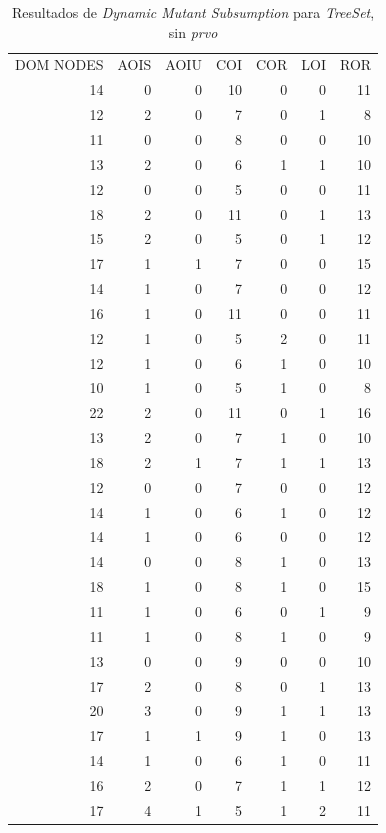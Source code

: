 \begin{table}[]
	\caption{Resultados de \emph{Dynamic Mutant Subsumption} para \emph{TreeSet}, sin \emph{prvo}}
	\label{tables.results.subsumption.treeset.noprvo}
	\centering
	\scriptsize
	\def\arraystretch{0.95}
	\setlength\tabcolsep{0.5mm}
	\begin{tabular}{rrrrrrr}
		DOM NODES & AOIS & AOIU & COI & COR & LOI & ROR \\
		14 & 0 & 0 & 10 & 0 & 0 & 11 \\
		12 & 2 & 0 & 7 & 0 & 1 & 8 \\
		11 & 0 & 0 & 8 & 0 & 0 & 10 \\
		13 & 2 & 0 & 6 & 1 & 1 & 10 \\
		12 & 0 & 0 & 5 & 0 & 0 & 11 \\
		18 & 2 & 0 & 11 & 0 & 1 & 13 \\
		15 & 2 & 0 & 5 & 0 & 1 & 12 \\
		17 & 1 & 1 & 7 & 0 & 0 & 15 \\
		14 & 1 & 0 & 7 & 0 & 0 & 12 \\
		16 & 1 & 0 & 11 & 0 & 0 & 11 \\
		12 & 1 & 0 & 5 & 2 & 0 & 11 \\
		12 & 1 & 0 & 6 & 1 & 0 & 10 \\
		10 & 1 & 0 & 5 & 1 & 0 & 8 \\
		22 & 2 & 0 & 11 & 0 & 1 & 16 \\
		13 & 2 & 0 & 7 & 1 & 0 & 10 \\
		18 & 2 & 1 & 7 & 1 & 1 & 13 \\
		12 & 0 & 0 & 7 & 0 & 0 & 12 \\
		14 & 1 & 0 & 6 & 1 & 0 & 12 \\
		14 & 1 & 0 & 6 & 0 & 0 & 12 \\
		14 & 0 & 0 & 8 & 1 & 0 & 13 \\
		18 & 1 & 0 & 8 & 1 & 0 & 15 \\
		11 & 1 & 0 & 6 & 0 & 1 & 9 \\
		11 & 1 & 0 & 8 & 1 & 0 & 9 \\
		13 & 0 & 0 & 9 & 0 & 0 & 10 \\
		17 & 2 & 0 & 8 & 0 & 1 & 13 \\
		20 & 3 & 0 & 9 & 1 & 1 & 13 \\
		17 & 1 & 1 & 9 & 1 & 0 & 13 \\
		14 & 1 & 0 & 6 & 1 & 0 & 11 \\
		16 & 2 & 0 & 7 & 1 & 1 & 12 \\
		17 & 4 & 1 & 5 & 1 & 2 & 11
	\end{tabular}
\end{table}


